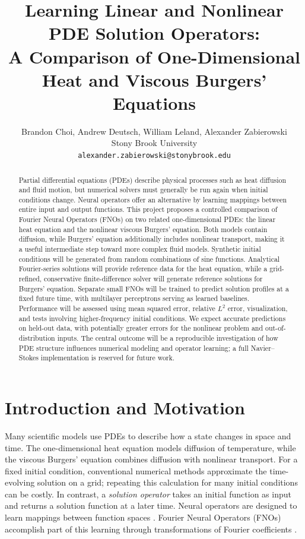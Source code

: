 \documentclass{article}
\title{Learning Linear and Nonlinear PDE Solution Operators:\\A Comparison of One-Dimensional Heat and Viscous Burgers' Equations}
\author{Brandon Choi, Andrew Deutsch, William Leland, Alexander Zabierowski \\
  Stony Brook University \\
  \texttt{alexander.zabierowski@stonybrook.edu}}
\date{}
\begin{document}
\maketitle

\begin{abstract}
Partial differential equations (PDEs) describe physical processes such as heat diffusion and fluid motion, but numerical solvers must generally be run again when initial conditions change. Neural operators offer an alternative by learning mappings between entire input and output functions. This project proposes a controlled comparison of Fourier Neural Operators (FNOs) on two related one-dimensional PDEs: the linear heat equation and the nonlinear viscous Burgers' equation. Both models contain diffusion, while Burgers' equation additionally includes nonlinear transport, making it a useful intermediate step toward more complex fluid models. Synthetic initial conditions will be generated from random combinations of sine functions. Analytical Fourier-series solutions will provide reference data for the heat equation, while a grid-refined, conservative finite-difference solver will generate reference solutions for Burgers' equation. Separate small FNOs will be trained to predict solution profiles at a fixed future time, with multilayer perceptrons serving as learned baselines. Performance will be assessed using mean squared error, relative $L^2$ error, visualization, and tests involving higher-frequency initial conditions. We expect accurate predictions on held-out data, with potentially greater errors for the nonlinear problem and out-of-distribution inputs. The central outcome will be a reproducible investigation of how PDE structure influences numerical modeling and operator learning; a full Navier--Stokes implementation is reserved for future work.
\end{abstract}

\section{Introduction and Motivation}
Many scientific models use PDEs to describe how a state changes in space and time. The one-dimensional heat equation models diffusion of temperature, while the viscous Burgers' equation combines diffusion with nonlinear transport. For a fixed initial condition, conventional numerical methods approximate the time-evolving solution on a grid; repeating this calculation for many initial conditions can be costly. In contrast, a \emph{solution operator} takes an initial function as input and returns a solution function at a later time. Neural operators are designed to learn mappings between function spaces \citep{kovachki2023neural}. Fourier Neural Operators (FNOs) accomplish part of this learning through transformations of Fourier coefficients \citep{li2021fourier}.
\end{document}
